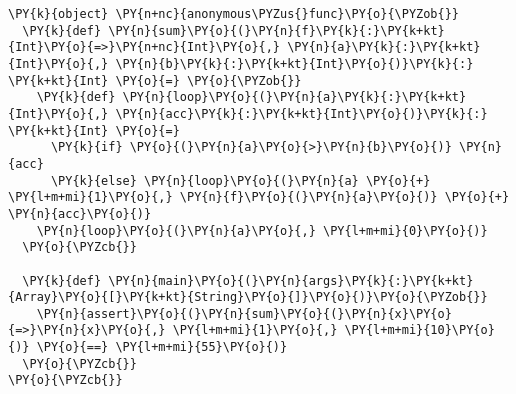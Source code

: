 \begin{Verbatim}[commandchars=\\\{\}]
\PY{k}{object} \PY{n+nc}{anonymous\PYZus{}func}\PY{o}{\PYZob{}}
  \PY{k}{def} \PY{n}{sum}\PY{o}{(}\PY{n}{f}\PY{k}{:}\PY{k+kt}{Int}\PY{o}{=>}\PY{n+nc}{Int}\PY{o}{,} \PY{n}{a}\PY{k}{:}\PY{k+kt}{Int}\PY{o}{,} \PY{n}{b}\PY{k}{:}\PY{k+kt}{Int}\PY{o}{)}\PY{k}{:} \PY{k+kt}{Int} \PY{o}{=} \PY{o}{\PYZob{}}
    \PY{k}{def} \PY{n}{loop}\PY{o}{(}\PY{n}{a}\PY{k}{:}\PY{k+kt}{Int}\PY{o}{,} \PY{n}{acc}\PY{k}{:}\PY{k+kt}{Int}\PY{o}{)}\PY{k}{:} \PY{k+kt}{Int} \PY{o}{=}
      \PY{k}{if} \PY{o}{(}\PY{n}{a}\PY{o}{>}\PY{n}{b}\PY{o}{)} \PY{n}{acc}
      \PY{k}{else} \PY{n}{loop}\PY{o}{(}\PY{n}{a} \PY{o}{+} \PY{l+m+mi}{1}\PY{o}{,} \PY{n}{f}\PY{o}{(}\PY{n}{a}\PY{o}{)} \PY{o}{+} \PY{n}{acc}\PY{o}{)}
    \PY{n}{loop}\PY{o}{(}\PY{n}{a}\PY{o}{,} \PY{l+m+mi}{0}\PY{o}{)}
  \PY{o}{\PYZcb{}}
  
  \PY{k}{def} \PY{n}{main}\PY{o}{(}\PY{n}{args}\PY{k}{:}\PY{k+kt}{Array}\PY{o}{[}\PY{k+kt}{String}\PY{o}{]}\PY{o}{)}\PY{o}{\PYZob{}}
    \PY{n}{assert}\PY{o}{(}\PY{n}{sum}\PY{o}{(}\PY{n}{x}\PY{o}{=>}\PY{n}{x}\PY{o}{,} \PY{l+m+mi}{1}\PY{o}{,} \PY{l+m+mi}{10}\PY{o}{)} \PY{o}{==} \PY{l+m+mi}{55}\PY{o}{)}
  \PY{o}{\PYZcb{}}
\PY{o}{\PYZcb{}}
\end{Verbatim}
